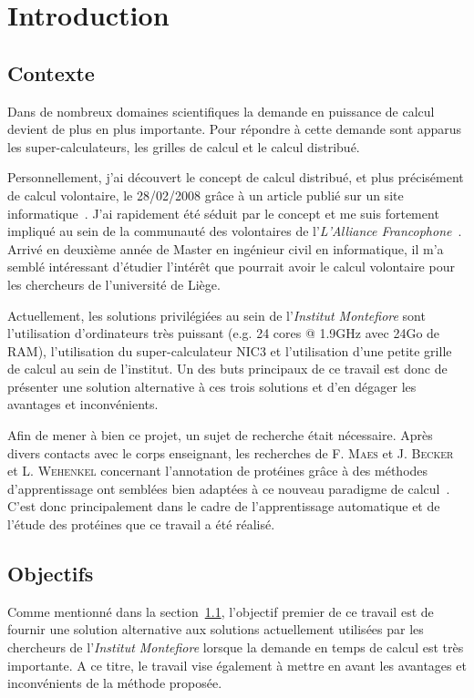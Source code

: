 \documentclass[a4paper, 11pt]{article}
\begin{document}
\newpage
\tableofcontents
\newpage


\section{Introduction}

\subsection{Contexte}
\label{contexte}
Dans de nombreux domaines scientifiques la demande en puissance de calcul devient de plus en plus importante. Pour répondre à cette demande sont apparus les super-calculateurs, les grilles de calcul et le calcul distribué.

Personnellement, j'ai découvert le concept de calcul distribué, et plus précisément de calcul volontaire, le 28/02/2008 grâce à un article publié sur un site informatique~\cite{MACG}. J'ai rapidement été séduit par le concept et me suis fortement impliqué au sein de la communauté des volontaires de l'\textit{L'Alliance Francophone}~\cite{AF}. Arrivé en deuxième année de Master en ingénieur civil en informatique, il m'a semblé intéressant d'étudier l'intérêt que pourrait avoir le calcul volontaire pour les chercheurs de l'université de Liège. 

Actuellement, les solutions privilégiées au sein de l'\textit{Institut Montefiore} sont l'utilisation d'ordinateurs très puissant (e.g. 24 cores @ 1.9GHz avec 24Go de RAM), l'utilisation du super-calculateur NIC3 et l'utilisation d'une petite grille de calcul au sein de l'institut. Un des buts principaux de ce travail est donc de présenter une solution alternative à ces trois solutions et d'en dégager les avantages et inconvénients.

Afin de mener à bien ce projet, un sujet de recherche était nécessaire. Après divers contacts avec le corps enseignant, les recherches de F. \textsc{Maes} et J. \textsc{Becker} et L. \textsc{Wehenkel} concernant l'annotation de protéines grâce à des méthodes d'apprentissage ont semblées bien adaptées à ce nouveau paradigme de calcul~\cite{POSTER}\cite{CAP}. C'est donc principalement dans le cadre de l'apprentissage automatique et de l'étude des protéines que ce travail a été réalisé.

\subsection{Objectifs}
Comme mentionné dans la section~\ref{contexte}, l'objectif premier de ce travail est de fournir une solution alternative aux solutions actuellement utilisées par les chercheurs de l'\textit{Institut Montefiore} lorsque la demande en temps de calcul est très importante. A ce titre, le travail vise également à mettre en avant les avantages et inconvénients de la méthode proposée.
\end{document}
